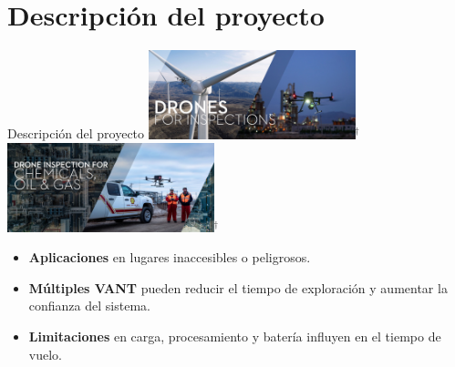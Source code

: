 \documentclass[
  24pt, %
  aspectratio=169, %
]{beamer}
\begin{document}
\section{Descripción del proyecto}
\begin{frame}{Descripción del proyecto}
  \bigskip %
  \centering
  \includegraphics[width=0.45\textwidth,height=0.35\textheight]{DJI_B1}$^\dag$
  \hfil
  \includegraphics[width=0.45\textwidth,height=0.35\textheight]{DJI_B4}$^\dag$
  \vspace{2pt}\\
  
  \begin{itemize}
  \item \textbf{Aplicaciones} en lugares inaccesibles o peligrosos.
  \item \textbf{Múltiples VANT} pueden reducir el tiempo de exploración y aumentar la confianza del sistema.
  \item \textbf{Limitaciones} en carga, procesamiento y batería influyen en el tiempo de vuelo.
  \end{itemize}

\end{frame}
\end{document}

